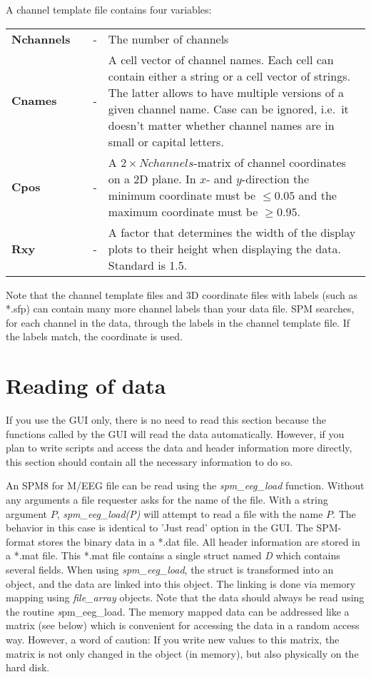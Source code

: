 A channel template file contains four variables:\\

\begin{tabular}{llcp{9cm}}
{\bf Nchannels} & &  - & The number of channels\\
{\bf Cnames}&  & - & A cell vector of channel names. Each cell can
contain either a string or a cell vector of strings. The latter allows
to have multiple versions of a given channel name. Case can be
ignored, i.e.~it doesn't matter whether channel names are in small or
capital letters.\\
{\bf Cpos} & & - & A $2 \times Nchannels$-matrix of channel
coordinates on a 2D plane. In $x$- and $y$-direction the minimum
coordinate must be $\leq 0.05$ and the maximum coordinate
must be $\geq 0.95$. \\ 
{\bf Rxy} & & - & A factor that determines the width of the display
plots to their height when displaying the data. Standard is 1.5. \\
\end{tabular}

Note that the channel template files and 3D coordinate files with labels
(such as *.sfp) can contain many more channel
labels than your data file. SPM searches, for each channel in the
data, through the labels in the channel template file. If the labels
match, the coordinate is used. 


\section{Reading of data}
\label{sec:load}
If you use the GUI only, there is no need to read this
section because the functions called by the GUI will read the data
automatically. However, if you plan to write scripts and access the
data and header information more directly, this section should contain
all the necessary information to do so. 

An SPM8 for M/EEG file can be read using the \textit{spm\_eeg\_load}
function. Without any arguments a file requester asks for the name of
the file. With a string argument $P$, \textit{spm\_eeg\_load(P)} will
attempt to read a file with the name $P$. The behavior in this case is
identical to 'Just read' option in the GUI. The SPM-format stores the
binary data in a *.dat file. All header information are stored in a
*.mat file. This *.mat file contains a single struct named {\textit D}
which contains several fields. When using \textit{spm\_eeg\_load}, the
struct is transformed into an object, and the data are linked into this
object. The linking is done via memory mapping using \textit{file\_array}
objects. Note that the data should always be read using the routine 
{\textit spm\_eeg\_load}. The memory mapped data can be
addressed like a matrix (see below) which is convenient for accessing
the data in a random access way. However, a word of caution: If you
write new values to this matrix, the matrix is not only changed
in the object (in memory), but also physically on the hard
disk.  

